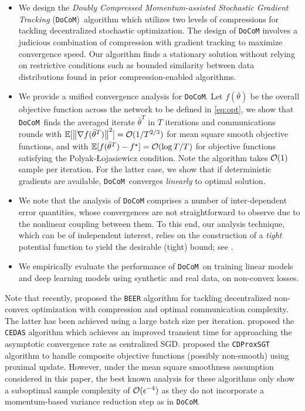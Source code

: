 \documentclass[10pt]{article} %
\newcommand{\revision}{}
\theoremstyle{plain}
\theoremstyle{definition}
\theoremstyle{remark}
\newcommand{\aname}{{\tt DoCoM}}
\newcommand{\prm}{\theta}
\newcommand{\avgtheta}{\bar{\prm}}
\newcommand{\norm}[1]{\left\| #1 \right\|}
\begin{document}
\begin{itemize}[leftmargin=*, topsep=0mm, itemsep =0.25mm]
    \item We design the \emph{Doubly Compressed Momentum-assisted Stochastic Gradient Tracking} (\aname)~algorithm which utilizes two levels of compressions for tackling decentralized stochastic optimization. The design of {\aname} involves a judicious combination of compression with gradient tracking to maximize convergence speed. Our algorithm finds a stationary solution without relying on restrictive conditions such as bounded similarity between data distributions found in prior compression-enabled algorithms. 
    \item We provide a unified convergence analysis for \aname. Let $f(\avgtheta)$ be the overall objective function across the network to be defined in \eqref{eq:opt}, we show that \aname~finds the averaged iterate $\avgtheta^T$ in $T$ iterations and communications rounds with $\mathbb{E} [ \norm{ \nabla f(\avgtheta^T) }^2 ] = {\cal O}( 1 / {T}^{2/3} )$ for {\revision mean square smooth} objective functions, and with $\mathbb{E} [ f( \avgtheta^T ) - f^\star ] = {\cal O}( \log T / {T} )$ for objective functions satisfying the Polyak-Łojasiewicz condition. Note the algorithm takes ${\cal O}(1)$ sample per iteration. For the latter case, we show that if deterministic gradients are available, \aname~converges \emph{linearly} to optimal solution. 
    \item We note that the analysis of {\aname} comprises a number of inter-dependent error quantities, whose convergences are not straightforward to observe due to the nonlinear coupling between them. To this end, our analysis technique, which can be of independent interest, relies on the construction of a \emph{tight} potential function to yield the desirable (tight) bound; see . 
     \item We empirically evaluate the performance of \aname~on training linear models and deep learning models using synthetic and real data, on non-convex losses.
\end{itemize}\vspace{-.1cm}
Note that recently, \citet{zhao2022beer} proposed the {\tt BEER} algorithm for tackling decentralized non-convex optimization with compression and optimal communication complexity. The latter has been achieved using a large batch size per iteration.
\citet{huang2023cedas} proposed the {\tt CEDAS} algorithm which achieves an improved transient time for approaching the asymptotic convergence rate as centralized SGD. {\revision \citet{yan2023compressed} proposed the {\tt CDProxSGT} algorithm to handle composite objective functions (possibly non-smooth) using proximal update.} However, {\revision under the mean square smoothness assumption considered in this paper}, the best known analysis for these algorithms only show a suboptimal sample complexity of ${\cal O}(\epsilon^{-4})$ as they do not incorporate a {\revision momentum-based} variance reduction step as in {\aname}.
\end{document}
